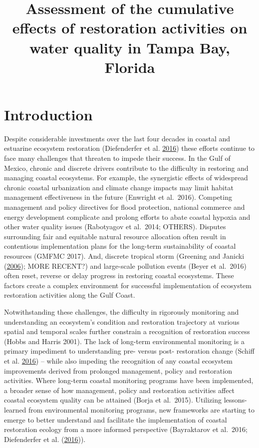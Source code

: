 \documentclass[]{article}
\title{Assessment of the cumulative effects of restoration activities on water
quality in Tampa Bay, Florida}
\author{}
\date{}
\begin{document}
\maketitle

\hypertarget{introduction}{%
\section{Introduction}\label{introduction}}

Despite considerable investments over the last four decades in coastal
and estuarine ecosystem restoration (Diefenderfer et al.
\protect\hyperlink{ref-Diefenderfer16}{2016}) these efforts continue to
face many challenges that threaten to impede their success. In the Gulf
of Mexico, chronic and discrete drivers contribute to the difficulty in
restoring and managing coastal ecosystems. For example, the synergistic
effects of widespread chronic coastal urbanization and climate change
impacts may limit habitat management effectiveness in the future
(Enwright et al.~2016). Competing management and policy directives for
flood protection, national commerce and energy development complicate
and prolong efforts to abate coastal hypoxia and other water quality
issues (Rabotyagov et al.~2014; OTHERS). Disputes surrounding fair and
equitable natural resource allocation often result in contentious
implementation plans for the long-term sustainability of coastal
resources (GMFMC 2017). And, discrete tropical storm (Greening and
Janicki (\protect\hyperlink{ref-Greening06}{2006}); MORE RECENT?) and
large-scale pollution events (Beyer et al.~2016) often reset, reverse or
delay progress in restoring coastal ecosystems. These factors create a
complex environment for successful implementation of ecosystem
restoration activities along the Gulf Coast.

Notwithstanding these challenges, the difficulty in rigorously
monitoring and understanding an ecosystem's condition and restoration
trajectory at various spatial and temporal scales further constrain a
recognition of restoration success (Hobbs and Harris 2001). The lack of
long-term environmental monitoring is a primary impediment to
understanding pre- versus post- restoration change (Schiff et al.
\protect\hyperlink{ref-Schiff16}{2016}) -- while also impeding the
recognition of any coastal ecosystem improvements derived from prolonged
management, policy and restoration activities. Where long-term coastal
monitoring programs have been implemented, a broader sense of how
management, policy and restoration activities affect coastal ecosystem
quality can be attained (Borja et al.~2015). Utilizing lessons-learned
from environmental monitoring programs, new frameworks are starting to
emerge to better understand and facilitate the implementation of coastal
restoration ecology from a more informed perspective (Bayraktarov et
al.~2016; Diefenderfer et al.
(\protect\hyperlink{ref-Diefenderfer16}{2016})).
\end{document}
